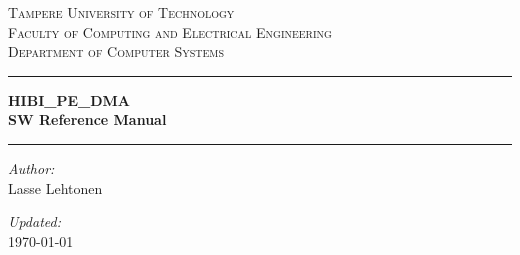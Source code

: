 \documentclass[a4paper,10pt,oneside,final]{article}
\def\defauthor{Lasse Lehtonen}
\begin{document}
\hypersetup{pageanchor=false}
\begin{titlepage}

\begin{center}

\vspace{6.0cm}
\textsc{\LARGE Tampere University of Technology}\\[1.0cm]
\textsc{\Large Faculty of Computing and Electrical Engineering}\\[1.0cm]
\textsc{\Large Department of Computer Systems}\\[1.0cm]
\vspace{6.0cm}
\hrule
\vspace{0.4cm}
{ \huge \bfseries HIBI\_PE\_DMA\\\vspace{10pt}SW Reference Manual}
\vspace{0.4cm}
\hrule


\vfill

\begin{minipage}{0.4\textwidth}
\begin{flushleft} \large
\emph{Author:}\\
\defauthor
\end{flushleft}
\end{minipage}
\begin{minipage}{0.4\textwidth}
\begin{flushright} \large
\emph{Updated:} \\
\today
\end{flushright}
\end{minipage}

\end{center}


\end{titlepage}
\tableofcontents
{}
\hypersetup{pageanchor=true}
\end{document}
